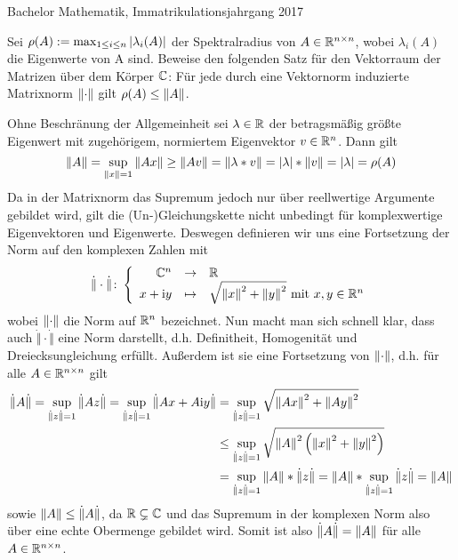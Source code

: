 \begin{exercisePage}
	\newcommand{\cnorm}[1]{\dot{\Vert} #1 \dot{\Vert}}
	\renewcommand{\i}{\mathrm{i}}
	
	\newcommand{\NNorm}[1]{{\left\vert\kern-0.25ex\left\vert\kern-0.25ex\left\vert #1 \right\vert\kern-0.25ex\right\vert\kern-0.25ex\right\vert}} 
	
	\begin{flushright}
		\osfamily \textcolor{cdgray}{Bachelor Mathematik, Immatrikulationsjahrgang 2017}
	\end{flushright}
	\begin{exercise}
		Sei $\rho(A) \mathrel{:=} \max_{1 \leq i \leq n} \left| \lambda_i(A) \right|$ der Spektralradius von $A \in \mathbb{R}^{n \times n}$, wobei $\lambda_i(A)$ die Eigenwerte von
		A sind. Beweise den folgenden Satz für den Vektorraum der Matrizen über dem Körper $\mathbb{C}$: Für jede durch eine Vektornorm induzierte Matrixnorm $\left\lVert \cdot \right\rVert$ gilt $\rho(A) \leq \left\lVert A \right\rVert$.
	\end{exercise}

	Ohne Beschränung der Allgemeinheit sei $\lambda \in \mathbb{R}$ der betragsmäßig größte Eigenwert mit zugehörigem, normiertem Eigenvektor $v \in \mathbb{R}^n$. Dann gilt
	\begin{equation*}
		\left\lVert A \right\rVert = \sup_{\left\lVert x \right\rVert = 1} \left\lVert Ax \right\rVert \geq \left\lVert Av \right\rVert = \left\lVert \lambda * v \right\rVert = \left| \lambda \right| * \left\lVert v \right\rVert = \left| \lambda \right| = \rho(A)
	\end{equation*}
	Da in der Matrixnorm das Supremum jedoch nur über reellwertige Argumente gebildet wird, gilt die (Un-)Gleichungskette nicht unbedingt für komplexwertige Eigenvektoren und Eigenwerte. Deswegen definieren wir uns eine Fortsetzung der Norm auf den komplexen Zahlen mit
	\begin{equation*}
		\bigabb{\cnorm{\cdot}}{\C^n}{\R}{x+ \i y}{\sqrt{\norm{x}^2 + \norm{y}^2} \text{ mit } x,y \in \Rn}
	\end{equation*}
	wobei $\left\lVert \cdot \right\rVert$ die Norm auf $\mathbb{R}^n$ bezeichnet. Nun macht man sich schnell klar, dass auch $\cnorm{\cdot}$ eine Norm darstellt, d.h. Definitheit, Homogenität und Dreiecksungleichung erfüllt. Außerdem ist sie eine Fortsetzung von $\left\lVert \cdot \right\rVert$, d.h. für alle $A \in \mathbb{R}^{n \times n}$ gilt
	\begin{align*}
		\cnorm{A}
		= \sup_{\cnorm{z} = 1} \cnorm{Az} 
		= \sup_{\cnorm{z} = 1} \cnorm{Ax + A \i y} 
		&= \sup_{\cnorm{z} = 1} \sqrt{\norm{Ax}^2 + \norm{Ay}^2} \\
		&\leq \sup_{\cnorm{z} = 1} \sqrt{\norm{A}^2 \left( \norm{x}^2 + \norm{y}^2 \right) } \\
		&= \sup_{\cnorm{z} = 1} \norm{A} * \cnorm{z}
		= \norm{A} * \sup_{\cnorm{z} = 1} \cnorm{z}
		= \norm{A}
	\end{align*}
	sowie $\norm{A} \leq \cnorm{A}$, da $\mathbb{R} \subsetneq \mathbb{C}$ und das Supremum in der komplexen Norm also über eine echte Obermenge gebildet wird. Somit ist also $\cnorm{A} = \norm{A}$ für alle $A \in \mathbb{R}^{n \times n}$.
	

\end{exercisePage}
